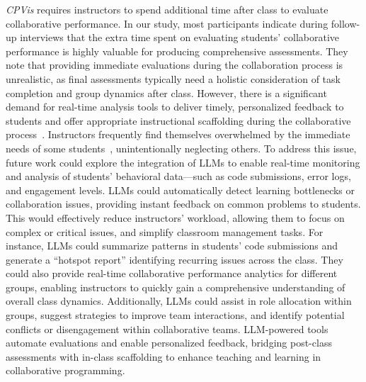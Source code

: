 {\textit{CPVis} requires instructors to spend additional time after class to evaluate collaborative performance. In our study, most participants indicate during follow-up interviews that the extra time spent on evaluating students' collaborative performance is highly valuable for producing comprehensive assessments. They note that providing immediate evaluations during the collaboration process is unrealistic, as final assessments typically need a holistic consideration of task completion and group dynamics after class. However, there is a significant demand for real-time analysis tools to deliver timely, personalized feedback to students and offer appropriate instructional scaffolding during the collaborative process~\cite{tang2024sphere}.
Instructors frequently find themselves overwhelmed by the immediate needs of some students~\cite{yang2023pair}, unintentionally neglecting others. To address this issue, future work could explore the integration of LLMs to enable real-time monitoring and analysis of students' behavioral data—such as code submissions, error logs, and engagement levels. LLMs could automatically detect learning bottlenecks or collaboration issues, providing instant feedback on common problems to students. This would effectively reduce instructors' workload, allowing them to focus on complex or critical issues, and simplify classroom management tasks.
For instance, LLMs could summarize patterns in students' code submissions and generate a ``hotspot report'' identifying recurring issues across the class. They could also provide real-time collaborative performance analytics for different groups, enabling instructors to quickly gain a comprehensive understanding of overall class dynamics. Additionally, LLMs could assist in role allocation within groups, suggest strategies to improve team interactions, and identify potential conflicts or disengagement within collaborative teams.
LLM-powered tools automate evaluations and enable personalized feedback, bridging post-class assessments with in-class scaffolding to enhance teaching and learning in collaborative programming.}